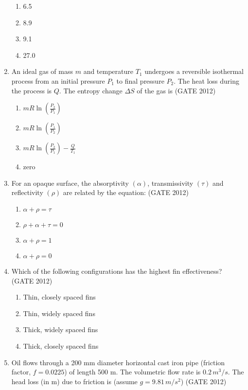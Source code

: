\documentclass[journal,12pt,onecolumn]{IEEEtran}
\theoremstyle{remark}
\begin{document}
\begin{enumerate}
\begin{enumerate}
\item 6.5
\item 8.9
\item 9.1
\item 27.0
\end{enumerate}
\vspace{1cm}
\item  An ideal gas of mass $m$ and temperature $T_1$ undergoes a reversible isothermal process from an initial pressure $P_1$ to final pressure $P_2$. The heat loss during the process is $Q$. The entropy change $\Delta S$ of the gas is
\hfill{(GATE 2012)}

\begin{enumerate}
\item $mR \ln \left(\frac{P_2}{P_1}\right)$
\item $mR \ln \left(\frac{P_1}{P_2}\right)$
\item $mR \ln \left(\frac{P_2}{P_1}\right) - \frac{Q}{T_1}$
\item zero
\end{enumerate}
\vspace{1cm}
\item For an opaque surface, the absorptivity $(\alpha)$, transmissivity $(\tau)$ and reflectivity $(\rho)$ are related by the equation:
\hfill{(GATE 2012)}

\begin{enumerate}
\item $\alpha + \rho = \tau$
\item $\rho + \alpha + \tau = 0$
\item $\alpha + \rho = 1$
\item $\alpha + \rho = 0$
\end{enumerate}
\vspace{1cm}
\item  Which of the following configurations has the highest fin effectiveness?
\hfill{(GATE 2012)}

\begin{enumerate}
\item Thin, closely spaced fins
\item Thin, widely spaced fins
\item Thick, widely spaced fins
\item Thick, closely spaced fins
\end{enumerate}
\vspace{1cm}
\item  Oil flows through a 200 mm diameter horizontal cast iron pipe (friction factor, $f=0.0225$) of length 500 m. The volumetric flow rate is $0.2 \, m^3/s$. The head loss (in m) due to friction is (assume $g=9.81 \, m/s^2$)
\hfill{(GATE 2012)}


\end{enumerate}
\end{document}
